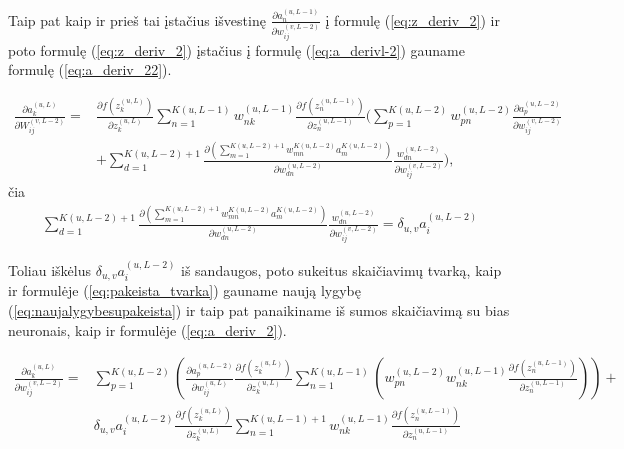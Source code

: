 Taip pat kaip ir prieš tai įstačius išvestinę $\frac{\partial a_n^{(u,L-1)}}{\partial w_{ij}^{(v,L-2)}}$ į formulę (\ref{eq:z_deriv_2}) ir poto formulę (\ref{eq:z_deriv_2}) įstačius į formulę (\ref{eq:a_derivl-2}) gauname formulę (\ref{eq:a_deriv_22}).


\begin{equation}\label{eq:a_deriv_22}
  \begin{aligned}
    \frac{\partial a_k^{(u, L)}}{\partial W_{ij}^{(v,L-2)}} =&
      \frac{\partial f(z_k^{(u, L)})}{\partial z_k^{(u,L)}} \sum_{n=1}^{K(u, L-1)} w_{nk}^{(u,L-1)}
      \frac{\partial f(z_n^{(u, L-1)})}{\partial z_n^{(u,L-1)}}
      (\sum_{p=1}^{K(u, L-2)} w_{pn}^{(u,L-2)}
      \frac{\partial a_p^{(u,L-2)}}{\partial w_{ij}^{(v,L-2)}} \\
    &+ \sum_{d=1}^{K(u,L-2)+1} \frac{\partial (\sum_{m=1}^{K(u,L-2)+1} w_{mn}^{K(u,L-2)} a_m^{K(u,L-2)})}{\partial w_{dn}^{(u,L-2)}}
      \frac{w_{dn}^{(u,L-2)}}{\partial w_{ij}^{(v,L-2)}}),
  \end{aligned}
\end{equation}
čia
\begin{equation*}
  \begin{aligned}
    \sum_{d=1}^{K(u,L-2)+1} \frac{\partial (\sum_{m=1}^{K(u,L-2)+1} w_{mn}^{K(u,L-2)} a_m^{K(u,L-2)})}{\partial w_{dn}^{(u,L-2)}} \frac{w_{dn}^{(u,L-2)}}{\partial w_{ij}^{(v,L-2)}}=\delta_{u,v}a_i^{(u,L-2)}
  \end{aligned}
\end{equation*}


Toliau iškėlus $\delta_{u,v}a_i^{(u,L-2)}$ iš sandaugos, poto sukeitus skaičiavimų tvarką, kaip ir formulėje (\ref{eq:pakeista_tvarka}) gauname naują lygybę (\ref{eq:naujalygybesupakeista}) ir taip pat panaikiname iš sumos skaičiavimą su bias neuronais, kaip ir formulėje (\ref{eq:a_deriv_2}).

\begin{equation}\label{eq:naujalygybesupakeista}
  \begin{aligned}
    \frac{\partial a_k^{(u, L)}}{\partial w_{ij}^{(v,L-2)}} = &
      \sum_{p=1}^{K(u,L-2)} \left ( \frac{ \partial a_p^{(u,L-2)} }{ \partial w_{ij}^{(u,L)} }\frac{ \partial f(z_k^{(u,L)}) }{ \partial z_k^{(u,L)} } \sum_{n=1}^{K(u,L-1)}\left( w_{pn}^{(u,L-2)}w_{nk}^{(u,L-1)}\frac{ \partial f(z_n^{(u,L-1)}) }{ \partial z_n^{(u,L-1)}} \right ) \right  )+\\
       &\delta_{u,v}a_i^{(u,L-2)}\frac{\partial f(z_k^{(u,L)})}{\partial z_k^{(u,L)}}\sum_{n=1}^{K(u,L-1)+1} w_{nk}^{(u,L-1)} \frac{\partial f(z_n^{(u,L-1)})}{\partial z_n^{(u,L-1)}}
  \end{aligned}
\end{equation}


